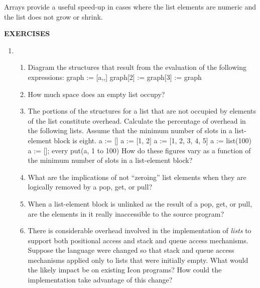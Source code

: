 Arrays provide a useful speed-up in cases where the list elements are
numeric and the list does not grow or shrink.

\bigskip

\noindent\textbf{EXERCISES}

\liststyleLvi
\begin{enumerate}
\item \begin{enumerate}
\item 
Diagram the structures that result from the evaluation of the
following expressions:\newline
 graph := [{\textquotedbl}a{\textquotedbl},,]\newline
 graph[2] := graph[3] := graph

\item How much space does an empty list occupy?

\item The portions of the structures for a list that are not occupied
by elements of the list constitute overhead. Calculate the percentage
of overhead in the following lists. Assume that the minimum number of
slots in a list-element block is eight.\newline
 a := []\newline
 a := [1, 2]\newline
 a := [1, 2, 3, 4, 5]\newline
 a := list(100)\newline
 a := []; every put(a, 1 to 100)\newline
How do these figures vary as a function of the minimum number of slots
in a list-element block?

\item What are the implications of not ``zeroing'' list elements when
they are logically removed by a pop, get, or pull?

\item When a list-element block is unlinked as the result of a pop,
get, or pull, are the elements in it really inaccessible to the
source program?

\item There is considerable overhead involved in the implementation of
\textit{lists }to support both positional access and stack and queue
access mechanisms. Suppose the language were changed so that stack and
queue access mechanisms applied only to lists that were initially
empty. What would the likely impact be on existing Icon programs? How
could the implementation take advantage of this change?


\end{enumerate}
\end{enumerate}
